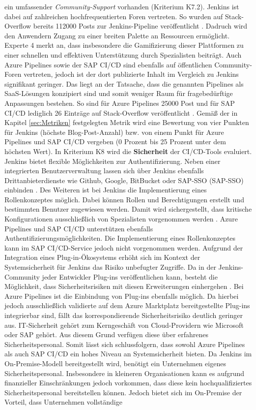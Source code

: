 ein umfassender \textit{Community-Support} vorhanden (Kriterium K7.2). Jenkins ist dabei auf zahlreichen hochfrequentierten Foren vertreten. So wurden auf Stack-Overflow bereits 112000 Posts zur Jenkins-Pipeline veröffentlicht \cite{StackOverflow.20230403d}. Dadruch wird den Anwendern Zugang zu einer breiten Palette an Ressourcen ermöglicht. Experte 4 merkt an, dass insbesondere die Gamifizierung dieser Plattformen zu einer schnellen und effektiven Unterstützung durch Spezialisten beiträgt. Auch Azure Pipelines sowie der SAP CI/CD sind ebenfalls auf öffentlichen Community-Foren vertreten, jedoch ist der dort publizierte Inhalt im Vergleich zu Jenkins signifikant geringer. Das liegt an der Tatsache, dass die genannten Pipelines als SaaS-Lösungen konzipiert sind und somit weniger Raum für fragebedürftige Anpassungen bestehen. So sind für Azure Pipelines 25000 Post und für SAP CI/CD lediglich 26 Einträge auf Stack-Overflow veröffentlicht \cite{StackOverflow.20230403b}\cite{StackOverflow.20230403c}. Gemäß der in Kapitel \ref{sec:Metriken} festgelegten Metrik wird eine Bewertung von vier Punkten für Jenkins (höchste Blog-Post-Anzahl) bzw. von einem Punkt für Azure Pipelines und SAP CI/CD vergeben (0 Prozent bis 25 Prozent unter dem höchsten Wert). In Kriterium K8 wird die \textbf{Sicherheit} der CI/CD-Tools evaluiert. Jenkins bietet flexible Möglichkeiten zur Authentifizierung. Neben einer integrierten Benutzerverwaltung lassen sich über Jenkins ebenfalls Drittanbieterdienste wie Github, Google, BitBucket oder SAP-\acl{SSO} (SAP-\acs{SSO}) einbinden \cite{.20230410f}. Des Weiteren ist bei Jenkins die Implementierung eines Rollenkonzeptes möglich. Dabei können Rollen und Berechtigungen erstellt und bestimmten Benutzer zugewiesen werden. Damit wird sichergestellt, dass kritische Konfigurationen ausschließlich von Spezialisten vorgenommen werden \cite{.20230410g}. Azure Pipelines und SAP CI/CD unterstützen ebenfalls Authentifizierungsmöglichkeiten. Die Implementierung eines Rollenkonzeptes kann im SAP CI/CD-Service jedoch nicht vorgenommen werden. Aufgrund der Integration eines Plug-in-Ökosystems erhöht sich im Kontext der Systemsicherheit für Jenkins das Risiko unbefugter Zugriffe. Da in der Jenkins-Community jeder Entwickler Plug-ins veröffentlichen kann, besteht die Möglichkeit, dass Sicherheitsrisiken mit diesen Erweiterungen einhergehen \cite[Z. 39]{SoftwareArchitektSAPDTSIntegration.}. Bei Azure Pipelines ist die Einbindung von Plug-ins ebenfalls möglich. Da hierbei jedoch ausschließlich validierte auf dem Azure Marktplatz bereitgestellte Plug-ins integrierbar sind, fällt das korrespondierende Sicherheitsrisiko deutlich geringer aus. IT-Sicherheit gehört zum Kerngeschäft von Cloud-Providern wie Microsoft oder SAP gehört. Aus diesem Grund verfügen diese über erfahrenes Sicherheitspersonal. Somit lässt sich schlussfolgern, dass sowohl Azure Pipelines als auch SAP CI/CD ein hohes Niveau an Systemsicherheit bieten. Da Jenkins im On-Premise-Modell bereitgestellt wird, benötigt ein Unternehmen eigenes Sicherheitspersonal. Insbesondere in kleineren Organisationen kann es aufgrund finanzieller Einschränkungen jedoch vorkommen, dass diese kein hochqualifiziertes Sicherheitspersonal bereitstellen können. Jedoch bietet sich im On-Premise der Vorteil, dass Unternehmen vollständige 